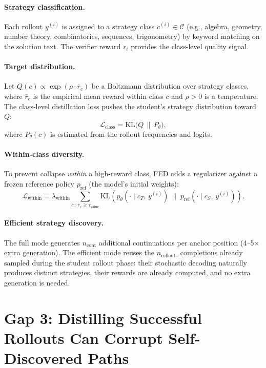 \documentclass[11pt]{article}
\newcommand{\KL}{\mathrm{KL}}
\begin{document}
\paragraph{Strategy classification.}
Each rollout $y^{(i)}$ is assigned to a strategy class $c^{(i)} \in \mathcal{C}$
(e.g., algebra, geometry, number theory, combinatorics, sequences, trigonometry) by
keyword matching on the solution text.  The verifier reward $r_i$ provides the class-level
quality signal.

\paragraph{Target distribution.}
Let $Q(c) \propto \exp(\rho \cdot \bar{r}_c)$ be a Boltzmann distribution over strategy
classes, where $\bar{r}_c$ is the empirical mean reward within class $c$ and $\rho > 0$ is
a temperature.  The class-level distillation loss pushes the student's strategy distribution
toward $Q$:
\[
  \mathcal{L}_{\mathrm{class}} = \KL\bigl(Q \,\|\, P_\theta\bigr),
\]
where $P_\theta(c)$ is estimated from the rollout frequencies and logits.

\paragraph{Within-class diversity.}
To prevent collapse \emph{within} a high-reward class, FED adds a regularizer against a
frozen reference policy $p_{\mathrm{ref}}$ (the model's initial weights):
\[
  \mathcal{L}_{\mathrm{within}}
  = \lambda_{\mathrm{within}}
    \sum_{c\,:\,\bar{r}_c \geq \tau_{\mathrm{value}}}
    \KL\!\left(p_\theta(\cdot \mid c_T,\, y^{(i)}) \;\|\; p_{\mathrm{ref}}(\cdot \mid c_S,\, y^{(i)})\right).
\]

\paragraph{Efficient strategy discovery.}
The full mode generates $n_{\mathrm{cont}}$ additional continuations per anchor position
(4--5$\times$ extra generation).  The efficient mode reuses the $n_{\mathrm{rollouts}}$
completions already sampled during the student rollout phase: their stochastic decoding
naturally produces distinct strategies, their rewards are already computed, and no extra
generation is needed.

\section{Gap 3: Distilling Successful Rollouts Can Corrupt Self-Discovered Paths}
\label{sec:og-opd}
\end{document}
